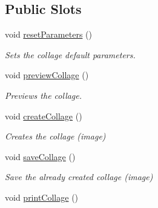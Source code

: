 \subsection*{Public Slots}
\begin{DoxyCompactItemize}
\item 
\hypertarget{class_collage_creator_ad1d158a014e922b387f321502a379176}{
void \hyperlink{class_collage_creator_ad1d158a014e922b387f321502a379176}{resetParameters} ()}
\label{class_collage_creator_ad1d158a014e922b387f321502a379176}

\begin{DoxyCompactList}\small\item\em Sets the collage default parameters. \item\end{DoxyCompactList}\item 
\hypertarget{class_collage_creator_a245511fd2980e38e2d1c480bfb1fb22a}{
void \hyperlink{class_collage_creator_a245511fd2980e38e2d1c480bfb1fb22a}{previewCollage} ()}
\label{class_collage_creator_a245511fd2980e38e2d1c480bfb1fb22a}

\begin{DoxyCompactList}\small\item\em Previews the collage. \item\end{DoxyCompactList}\item 
\hypertarget{class_collage_creator_ae056e0a9ea90bd1793df32fb464fb3cf}{
void \hyperlink{class_collage_creator_ae056e0a9ea90bd1793df32fb464fb3cf}{createCollage} ()}
\label{class_collage_creator_ae056e0a9ea90bd1793df32fb464fb3cf}

\begin{DoxyCompactList}\small\item\em Creates the collage (image) \item\end{DoxyCompactList}\item 
\hypertarget{class_collage_creator_a9baf8b138cf2ddc7ec9147b550178fe0}{
void \hyperlink{class_collage_creator_a9baf8b138cf2ddc7ec9147b550178fe0}{saveCollage} ()}
\label{class_collage_creator_a9baf8b138cf2ddc7ec9147b550178fe0}

\begin{DoxyCompactList}\small\item\em Save the already created collage (image) \item\end{DoxyCompactList}\item 
\hypertarget{class_collage_creator_a6efba57c99880aff4029c8cf216fd23a}{
void \hyperlink{class_collage_creator_a6efba57c99880aff4029c8cf216fd23a}{printCollage} ()}
\label{class_collage_creator_a6efba57c99880aff4029c8cf216fd23a}


\end{DoxyCompactItemize}
